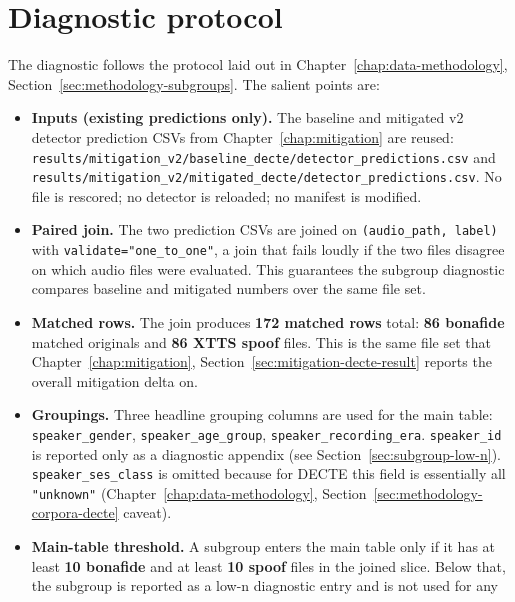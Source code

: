 \section{Diagnostic protocol}
\label{sec:subgroup-protocol}

The diagnostic follows the protocol laid out in Chapter~\ref{chap:data-methodology},
Section~\ref{sec:methodology-subgroups}. The salient points are:

\begin{itemize}
    \item \textbf{Inputs (existing predictions only).} The baseline and
        mitigated v2 detector prediction CSVs from Chapter~\ref{chap:mitigation} are
        reused: \texttt{results/mitigation\_v2/baseline\_decte/detector\_predictions.csv}
        and \texttt{results/mitigation\_v2/mitigated\_decte/detector\_predictions.csv}.
        No file is rescored; no detector is
        reloaded; no manifest is modified.
    \item \textbf{Paired join.} The two prediction CSVs are joined on
        \texttt{(audio\_path, label)} with \texttt{validate="one\_to\_one"}, a join
        that fails loudly if the two files disagree on which audio
        files were evaluated. This guarantees the subgroup diagnostic
        compares baseline and mitigated numbers over the same file
        set.
    \item \textbf{Matched rows.} The join produces \textbf{172 matched rows} total:
        \textbf{86 bonafide} matched originals and \textbf{86 XTTS spoof}
        files. This is the same file set that Chapter~\ref{chap:mitigation}, Section~\ref{sec:mitigation-decte-result}
        reports the overall mitigation delta on.
    \item \textbf{Groupings.} Three headline grouping columns are used for
        the main table: \texttt{speaker\_gender}, \texttt{speaker\_age\_group},
        \texttt{speaker\_recording\_era}. \texttt{speaker\_id} is reported only as a
        diagnostic appendix (see Section~\ref{sec:subgroup-low-n}). \texttt{speaker\_ses\_class} is
        omitted because for DECTE this field is essentially all
        \texttt{"unknown"} (Chapter~\ref{chap:data-methodology}, Section~\ref{sec:methodology-corpora-decte} caveat).
    \item \textbf{Main-table threshold.} A subgroup enters the main table
        only if it has at least \textbf{10 bonafide} and at least \textbf{10
        spoof} files in the joined slice. Below that, the subgroup is
        reported as a low-n diagnostic entry and is not used for any

\end{itemize}
